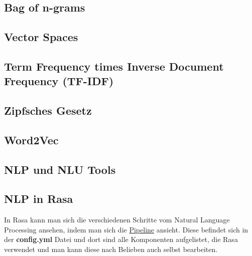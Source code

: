 \subsection{Bag of n-grams}


\subsection{Vector Spaces}


\subsection{Term Frequency times Inverse Document Frequency (TF-IDF)}


\subsection{Zipfsches Gesetz}


\subsection{Word2Vec}


\subsection{NLP und NLU Tools}


\subsection{NLP in Rasa}

In Rasa kann man sich die verschiedenen Schritte vom Natural Language Processing ansehen, indem man sich die \hyperref[sec:pipeline]{Pipeline} ansieht.
Diese befindet sich in der \textbf{config.yml} Datei und dort sind alle Komponenten aufgelistet, die Rasa verwendet und man kann diese nach Belieben auch selbst bearbeiten.